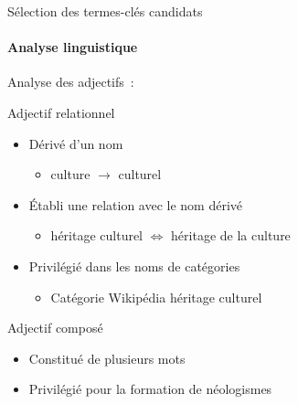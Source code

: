 \begin{frame}[t]{Sélection des termes-clés candidats}\framesubtitle{Analyse linguistique}
  Analyse des adjectifs~:

  \begin{block}{Adjectif relationnel}
    \begin{itemize}
      \item{Dérivé d'un nom}
      \begin{itemize}
        \item{\og{}culture\fg{} $\rightarrow$ \og{}culturel\fg{}}
      \end{itemize}
      \item{Établi une relation avec le nom dérivé}
      \begin{itemize}
        \item{\og{}héritage culturel\fg{} $\Leftrightarrow$ \og{}héritage de
              la culture\fg{}}
      \end{itemize}
      \item{Privilégié dans les noms de catégories}
      \begin{itemize}
        \item{Catégorie Wikipédia \og{}héritage culturel\fg{}}
      \end{itemize}
    \end{itemize}
  \end{block}

  \begin{block}{Adjectif composé}
    \begin{itemize}
      \item{Constitué de plusieurs mots}
      \item{Privilégié pour la formation de néologismes}
    \end{itemize}
  \end{block}
\end{frame}

